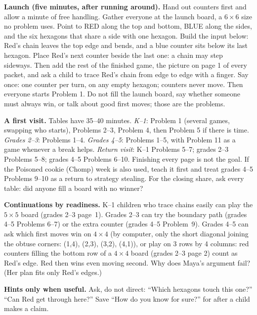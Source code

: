 \documentclass[11pt]{article}
\newcommand{\x}{\ensuremath{\times}}
\begin{document}
\textbf{Launch (five minutes, after running around).} Hand out counters first and allow a minute of free handling. Gather everyone at the launch board, a $6\x6$ size no problem uses. Point to RED along the top and bottom, BLUE along the sides, and the six hexagons that share a side with one hexagon. Build the input below: Red's chain leaves the top edge and bends, and a blue counter sits below its last hexagon. Place Red's next counter beside the last one: a chain may step sideways. Then add the rest of the finished game, the picture on page 1 of every packet, and ask a child to trace Red's chain from edge to edge with a finger. Say once: one counter per turn, on any empty hexagon; counters never move. Then everyone starts Problem 1. Do not fill the launch board, say whether someone must always win, or talk about good first moves; those are the problems.
\begin{center}\end{center}

\textbf{A first visit.} Tables have 35--40 minutes. \emph{K--1}: Problem 1 (several games, swapping who starts), Problems 2--3, Problem 4, then Problem 5 if there is time. \emph{Grades 2--3}: Problems 1--4. \emph{Grades 4--5}: Problems 1--5, with Problem 11 as a game whenever a break helps. \emph{Return visit}: K--1 Problems 5--7; grades 2--3 Problems 5--8; grades 4--5 Problems 6--10. Finishing every page is not the goal. If the Poisoned cookie (Chomp) week is also used, teach it first and treat grades 4--5 Problems 9--10 as a return to strategy stealing. For the closing share, ask every table: did anyone fill a board with no winner?

\textbf{Continuations by readiness.} K--1 children who trace chains easily can play the $5\x5$ board (grades 2--3 page~1). Grades 2--3 can try the boundary path (grades 4--5 Problems 6--7) or the extra counter (grades 4--5 Problem~9). Grades 4--5 can ask which first moves win on $4\x4$ (by computer, only the short diagonal joining the obtuse corners: (1,4), (2,3), (3,2), (4,1)), or play on 3 rows by 4 columns: red counters filling the bottom row of a $4\x4$ board (grades 2--3 page 2) count as Red's edge. Red then wins even moving second. Why does Maya's argument fail? (Her plan fits only Red's edges.)

\textbf{Hints only when useful.} Ask, do not direct: ``Which hexagons touch this one?'' ``Can Red get through here?'' Save ``How do you know for sure?'' for after a child makes a claim.
\end{document}
